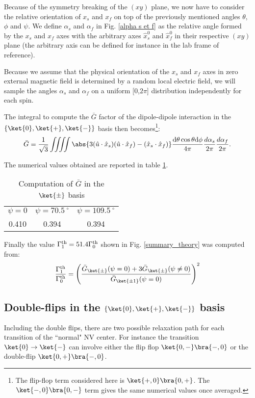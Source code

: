 \documentclass[a4paper, 11pt]{report}
\begin{document}
Because of the symmetry breaking of the $(xy)$ plane, we now have to consider the relative orientation of $x_s$ and $x_f$ on top of the previously mentioned angles $\theta$, $\phi$ and $\psi$. We define $\alpha_s$ and $\alpha_f$ in Fig. \ref{alpha s et f} as the relative angle formed by the $x_s$ and $x_f$ axes with the arbitrary axes $\hat x_s^0$ and $\hat x_f^0$ in their respective $(xy)$ plane (the arbitrary axis can be defined for instance in the lab frame of reference). 

Because we assume that the physical orientation of the $x_s$ and $x_f$ axes in zero external magnetic field is determined by a random local electric field, we will sample the angles $\alpha_s$ and $\alpha_f$ on a uniform [0,$2\pi$] distribution independently for each spin.

The integral to compute the $\bar G$ factor of the dipole-dipole interaction in the $\{ \ket{0}, \ket{+}, \ket{-}\}$ basis then becomes\footnote{The flip-flop term considered here is $\ket{+,0}\bra{0,+}$. The $\ket{-,0}\bra{0,-}$ term gives the same numerical values once averaged.}:
\begin{equation}
\bar G= \frac{1}{\sqrt{3}} \iiiint \abs{3(\hat{u}\cdot\hat{x}_s)(\hat{u}\cdot\hat{x}_f) - (\hat{x}_s \cdot \hat{x}_f)} \frac{\rm d\theta \cos \theta \rm d\phi}{4 \pi} \frac{d \alpha_s}{2\pi} \frac{d \alpha_f}{2\pi}.
\end{equation}

The numerical values obtained are reported in table \ref{table G flip-flop non mag}.
\begin{table}[htbp]
\centering
\caption{Computation of $\bar G$ in the $\ket{\pm}$ basis}
 \label{table G flip-flop non mag}
\begin{tabular}{c|c|c}
\toprule
$\psi=0$ & $\psi=70.5 \ ^\circ$ & $\psi=109.5 \ ^\circ$ \\

0.410 & 0.394 & 0.394 \\
\bottomrule
\end{tabular}
\end{table}

Finally the value $\Gamma_1^{\rm th}= 51.4 \Gamma_0^{\rm th}$ shown in Fig. \ref{summary_theory} was computed from:
\begin{equation}
\frac{\Gamma_1^{\rm th}}{\Gamma_0^{\rm th}}=\left(\frac{\bar G_{\ket{\pm}}(\psi=0) + 3 \bar G_{\ket{\pm}}(\psi\neq 0) }{\bar G_{\ket{\pm 1}}(\psi=0)}\right)^2
\end{equation}
\subsection{Double-flips in the $\{ \ket{0}, \ket{+}, \ket{-}\}$ basis}
Including the double flips, there are two possible relaxation path for each transition of the ``normal" NV center. For instance the transition $\ket{0} \to \ket{-}$ can involve either the flip flop $\ket{0,-} \bra{-,0}$ or the double-flip $\ket{0,+} \bra{-,0}$.
\end{document}
